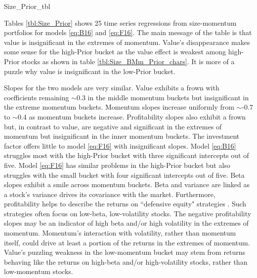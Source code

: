 
{Size_Prior_tbl}

Tables \ref{tbl:Size_Prior} shows 25
time series regressions from size-momentum portfolios for models
\ref{eq:B16} and \ref{eq:F16}.
The main message of the table is that value is insignificant in the extremes
of momentum.
Value's disappearance makes some sense for the high-Prior bucket as the value
effect is weakest among high-Prior stocks as shown in table
\ref{tbl:Size_BMm_Prior_chars}.
It is more of a puzzle why value is insignificant in the low-Prior bucket.

Slopes for the two models are very similar.
Value exhibits a frown with coefficients remaining $\sim$0.3 in the middle
momentum buckets but insignificant in the extreme momentum buckets.
Momentum slopes increase uniformly from $\sim$-0.7 to $\sim$0.4 as momentum
buckets increase.
Profitability slopes also exhibit a frown but, in contrast to value, are
negative and significant in the extremes of momentum but insignificant
in the inner momentum buckets.
The investment factor offers little to model \ref{eq:F16} with insignificant
slopes.
Model \ref{eq:B16} struggles most with the high-Prior bucket with three
significant intercepts out of five.
Model \ref{eq:F16} has similar problems in the high-Prior bucket but also
struggles with the small bucket with four significant intercepts out of five.
Beta slopes exhibit a smile across momentum buckets. Beta and variance are
linked as a stock's variance drives its covariance with the market.
Furthermore, profitability helps to describe the returns on ``defensive equity"
strategies \parencite{novy2014understanding}.
Such strategies often focus on low-beta, low-volatility stocks.
The negative profitability slopes may be an indicator of high beta and/or
high volatility in the extremes of momentum.
Momentum's interaction with volatility, rather than momentum itself, could
drive at least a portion of the returns in the extremes of momentum.
Value's puzzling weakness in the low-momentum bucket may stem from returns
behaving like the returns on high-beta and/or high-volatility stocks,
rather than low-momentum stocks.

